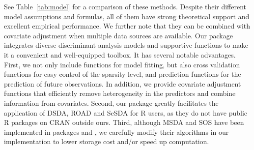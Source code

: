\begin{table}[t]
 \centering
 \caption{Comparison of model settings between models. SOS was originally proposed to deal with both binary and multiclass problems, but we focus on binary problems in the package. Model SeLDA stands for Semi-parametric linear discriminant analysis, which is introduced in Section~\ref{Sec: SeLDA}. Model TDA/CATCH represents tensor discriminant analysis and covariate-adjusted tensor in high-dimensions, which are illustrated in Section~\ref{Sec: CATCH} and \ref{catchmodel}. }\label{tab:model}
\end{table}


See Table~\ref{tab:model} for a comparison of these methods. Despite their different model assumptions and formulas, all of them have strong theoretical support and excellent empirical performance. We further note that they can be combined with covariate adjustment when multiple data sources are available. Our package  \citep{TULIP} integrates diverse discriminant analysis models and supportive functions to make it a convenient and well-equipped toolbox. It has several notable advantages. First, we not only include functions for model fitting, but also cross validation functions for easy control of the sparsity level, and prediction functions for the prediction of future observations. In addition, we provide covariate adjustment functions that efficiently remove heterogeneity in the predictors and combine information from covariates. Second, our package greatly facilitates the application of DSDA, ROAD and SeSDA for R users, as they do not have public R packages on CRAN outside ours. Third, although MSDA and SOS have been implemented in packages  \citep{MSDA} and  \citep{sparseLDA}, we carefully modify their algorithms in our implementation to lower storage cost and/or speed up computation. 






